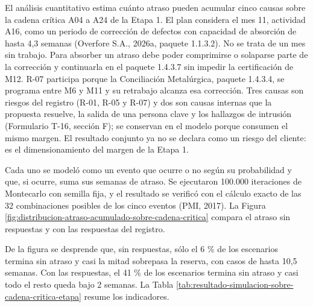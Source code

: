 \documentclass[subdoc]{../../comun/overfore}
\begin{document}
El análisis cuantitativo estima cuánto atraso pueden acumular cinco causas sobre la cadena crítica A04 a A24 de la Etapa 1. El plan considera el mes 11, actividad A16, como un periodo de corrección de defectos con capacidad de absorción de hasta 4,3 semanas (Overfore S.A., 2026a, paquete 1.1.3.2). No se trata de un mes sin trabajo. Para absorber un atraso debe poder comprimirse o solaparse parte de la corrección y continuarla en el paquete 1.4.3.7 sin impedir la certificación de M12. R-07 participa porque la Conciliación Metalúrgica, paquete 1.4.3.4, se programa entre M6 y M11 y su retrabajo alcanza esa corrección. Tres causas son riesgos del registro (R-01, R-05 y R-07) y dos son causas internas que la propuesta resuelve, la salida de una persona clave y los hallazgos de intrusión (Formulario T-16, sección F); se conservan en el modelo porque consumen el mismo margen. El resultado conjunto ya no se declara como un riesgo del cliente: es el dimensionamiento del margen de la Etapa 1.

Cada uno se modeló como un evento que ocurre o no según su probabilidad y que, si ocurre, suma sus semanas de atraso. Se ejecutaron 100.000 iteraciones de Montecarlo con semilla fija, y el resultado se verificó con el cálculo exacto de las 32 combinaciones posibles de los cinco eventos (PMI, 2017). La Figura \ref{fig:distribucion-atraso-acumulado-sobre-cadena-critica} compara el atraso sin respuestas y con las respuestas del registro.

De la figura se desprende que, sin respuestas, sólo el 6 \% de los escenarios termina sin atraso y casi la mitad sobrepasa la reserva, con casos de hasta 10,5 semanas. Con las respuestas, el 41 \% de los escenarios termina sin atraso y casi todo el resto queda bajo 2 semanas. La Tabla \ref{tab:resultado-simulacion-sobre-cadena-critica-etapa} resume los indicadores.
\end{document}
